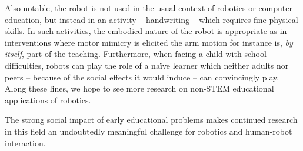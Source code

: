 \documentclass{sig-alternate}
\begin{document}
Also notable, the robot is not used in the usual context of robotics or computer
education, but instead in an activity -- handwriting -- which requires fine
physical skills. In such activities, the embodied nature of the robot is
appropriate as in interventions where motor mimicry is elicited
\cite{Berninger1997} the arm motion for instance is, \emph{by itself}, part of
the teaching. Furthermore, when facing a child with school difficulties, robots
can play the role of a na\"ive learner which neither adults nor peers -- because
of the social effects it would induce -- can convincingly play. Along these
lines, we hope to see more research on non-STEM educational applications of
robotics.


The strong social impact of early educational problems makes continued research
in this field an undoubtedly meaningful challenge for robotics and human-robot
interaction.

%





\end{document}
